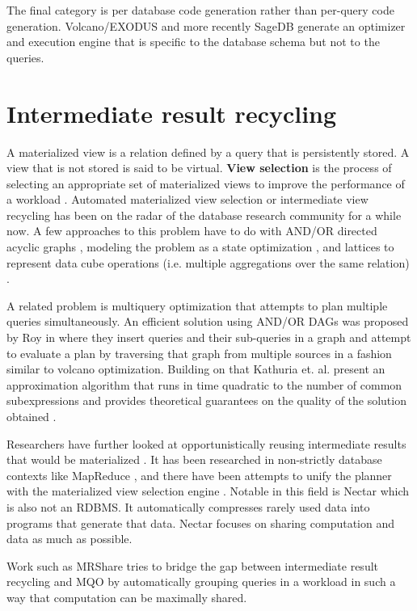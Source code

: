 The final category is per database code generation rather than per-query
code generation. Volcano/EXODUS
\cite{graefeVolcanoOptimizerGenerator1993a} and more recently SageDB
\cite{kraskaSageDBLearnedDatabase} generate an optimizer and execution
engine that is specific to the database schema but not to the queries.

\section{Intermediate result recycling}

A materialized view is a relation defined by a query that is
persistently stored. A view that is not stored is said to be
virtual. \textbf{View selection} is the process of selecting an appropriate
set of materialized views to improve the performance of a workload
\cite{mamiSurveyViewSelection2012}.  Automated materialized view
selection or intermediate view recycling has been on the radar of the
database research community for a while now. A few approaches to this
problem have to do with AND/OR directed acyclic graphs
\cite{guptaSelectionViewsMaterialize1997}, modeling the problem as a
state optimization \cite{theodoratosDataWarehouseConfiguration1997},
and lattices to represent data cube operations (i.e. multiple
aggregations over the same relation) \cite{ImplementingDataCubes}.

A related problem is multiquery optimization
\cite{theodoratosDataWarehouseConfiguration1997} that attempts to plan
multiple queries simultaneously. An efficient solution using AND/OR
DAGs was proposed by Roy in \cite{royEfficientExtensibleAlgorithms2000}
where they insert queries and their sub-queries in a graph and attempt
to evaluate a plan by traversing that graph from multiple sources in a
fashion similar to volcano optimization. Building on that Kathuria
et. al. present an approximation algorithm that runs in time
quadratic to the number of common subexpressions and provides
theoretical guarantees on the quality of the solution obtained
\cite{kathuriaEfficientProvableMultiquery2017}.

Researchers have further looked at opportunistically reusing
intermediate results that would be materialized
\cite{ivanovaArchitectureRecyclingIntermediates2010,nagelRecyclingPipelinedQuery2013}. It
has been researched in non-strictly database contexts like MapReduce
\cite{elghandourReStoreReusingResults2012a}, and there have been
attempts to unify the planner with the materialized view selection
engine \cite{perezHistoryawareQueryOptimization2014a}. Notable in this
field is Nectar \cite{gundaNectarAutomaticManagement2010} which is also
not an RDBMS. It automatically compresses rarely used data into
programs that generate that data. Nectar focuses on sharing
computation and data as much as possible.

Work such as MRShare \cite{nykielMRShareSharingMultiple2010} tries to
bridge the gap between intermediate result recycling and MQO by
automatically grouping queries in a workload in such a way that
computation can be maximally shared.
